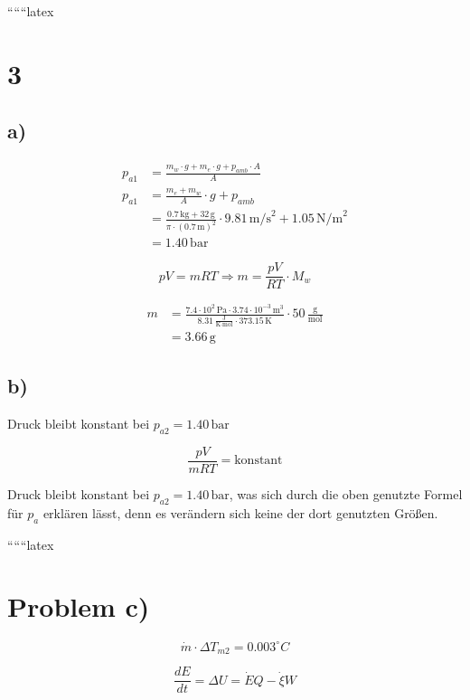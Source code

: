
``````latex


\section*{3}

\subsection*{a)}

\begin{align*}
p_{a1} &= \frac{m_w \cdot g + m_e \cdot g + p_{amb} \cdot A}{A} \\
p_{a1} &= \frac{m_e + m_w}{A} \cdot g + p_{amb} \\
&= \frac{0.7 \, \text{kg} + 32 \, \text{g}}{\pi \cdot (0.7 \, \text{m})^2} \cdot 9.81 \, \text{m/s}^2 + 1.05 \, \text{N/m}^2 \\
&= 1.40 \, \text{bar}
\end{align*}

\[
pV = mRT \Rightarrow m = \frac{pV}{RT} \cdot M_w
\]

\begin{align*}
m &= \frac{7.4 \cdot 10^2 \, \text{Pa} \cdot 3.74 \cdot 10^{-3} \, \text{m}^3}{8.31 \, \frac{\text{J}}{\text{K} \cdot \text{mol}} \cdot 373.15 \, \text{K}} \cdot 50 \, \frac{\text{g}}{\text{mol}} \\
&= 3.66 \, \text{g}
\end{align*}

\subsection*{b)}

Druck bleibt konstant bei $p_{a2} = 1.40 \, \text{bar}$

\[
\frac{pV}{mRT} = \text{konstant}
\]

Druck bleibt konstant bei $p_{a2} = 1.40 \, \text{bar}$, was sich durch die oben genutzte Formel für $p_a$ erklären lässt, denn es verändern sich keine der dort genutzten Größen.

``````latex

\section*{Problem c)}

\[
\dot{m} \cdot \Delta T_{m2} = 0.003^\circ C
\]

\[
\frac{dE}{dt} = \Delta U = \dot{E}Q - \dot{\xi}W
\]

